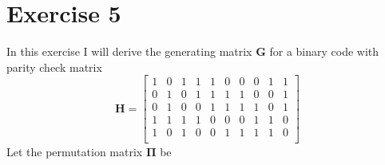 \documentclass[10pt]{article}
\begin{document}

\section*{Exercise 5}
In this exercise I will derive the generating matrix $\mathbf{G}$ for a binary code with parity check matrix
\begin{equation}
	\mathbf{H} = 
	\begin{bmatrix}
		1&0&1&1&1&0&0&0&1&1\\
		0&1&0&1&1&1&1&0&0&1\\
		0&1&0&0&1&1&1&1&0&1\\
		1&1&1&1&0&0&0&1&1&0\\
		1&0&1&0&0&1&1&1&1&0\\
	\end{bmatrix}
\end{equation}
Let the permutation matrix $\mathbf{\Pi}$ be
\end{document}
